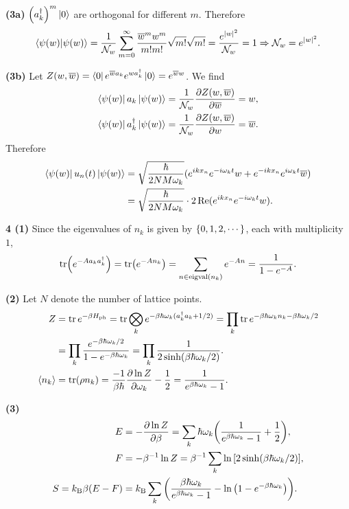 \documentclass{article}
\makeatletter
\newcommand*{\shifttext}[1]{%
  \settowidth{\@tempdima}{#1}%
  \hspace{-\@tempdima}#1%
}
\newcommand{\plabel}[1]{%
\shifttext{\textbf{#1}\quad}%
}
\newcommand{\prule}{%
\begin{center}%
\hdashrule[0.5ex]{.99\linewidth}{1pt}{1pt 2.5pt}%
\end{center}%
}
\makeatother
\begin{document}
\plabel{(3a)}%
$\qty(a_k^\dagger)^m\ket{0}$ are orthogonal for different $m$. Therefore
\[ \bra{\psi(w)}\ket{\psi(w)} = \frac{1}{\mathcal{N}_w} \sum_{m=0}^\infty \frac{\overline{w}^m w^m}{m! m!} \sqrt{m!}\sqrt{m!} = \frac{e^{\abs{w}^2}}{\mathcal{N}_w} = 1 \Rightarrow \mathcal{N}_w = e^{\abs{w}^2}. \]

\plabel{(3b)}%
Let $Z(w,\overline{w}) = \bra{0} e^{\overline{w}a_k} e^{w a^\dagger_k} \ket{0} = e^{\overline{w}w}$. We find
\begin{align*}
    \bra{\psi(w)}a_k\ket{\psi(w)} &= \frac{1}{\mathcal{N}_w} \pdv{Z(w,\overline{w})}{\overline{w}} = w, \\
    \bra{\psi(w)}a_k^\dagger\ket{\psi(w)} &= \frac{1}{\mathcal{N}_w} \pdv{Z(w,\overline{w})}{w} = \overline{w}.
\end{align*}
Therefore
\begin{align*}
    \bra{\psi(w)}u_n(t)\ket{\psi(w)} &= \sqrt{\frac{\hbar}{2N M\omega_k}} (e^{ikx_n} e^{-i\omega_k t}w + e^{-ikx_n}e^{i\omega_k t}\overline{w}) \\
    &= \sqrt{\frac{\hbar}{2N M\omega_k}} \cdot 2\Re (e^{ikx_n} e^{-i\omega_k t}w).
\end{align*}

\prule
\plabel{4 (1)}%
Since the eigenvalues of $n_k$ is given by $\qty{0,1,2,\cdots}$, each with multiplicity $1$,
\[ \tr(e^{-Aa_k a^\dagger_k}) = \tr(e^{-An_k}) = \sum_{n\in\operatorname{eigval}(n_k)} e^{-An} = \frac{1}{1-e^{-A}}. \]

\plabel{(2)}%
Let $N$ denote the number of lattice points.
\begin{align*}
    Z &= \tr e^{-\beta H_{\mathrm{ph}}} = \tr \bigotimes_k e^{-\beta \hbar\omega_k (a^\dagger_k a_k + 1/2)} = \prod_k \tr e^{-\beta \hbar\omega_k n_k - \beta \hbar\omega_k/2} \\
    &= \prod_k \frac{e^{-\beta\hbar\omega_k/2}}{1-e^{-\beta\hbar\omega_k}} = \prod_k \frac{1}{2\sinh (\beta\hbar\omega_k/2)}. \\
    \langle n_k \rangle &= \tr(\rho n_k) = \frac{-1}{\beta\hbar} \pdv{\ln Z}{\omega_k} - \frac{1}{2} = \frac{1}{e^{\beta\hbar\omega_k} - 1}.
\end{align*}

\plabel{(3)}%
\begingroup\abovedisplayskip=0pt\abovedisplayshortskip=0pt~\vspace*{-\baselineskip}%
\begin{align*}
    E &= -\pdv{\ln Z}{\beta} = \sum_k \hbar\omega_k \qty(\frac{1}{e^{\beta\hbar\omega_k} - 1} + \frac{1}{2}), \\
    F &= -\beta^{-1}\ln Z = \beta^{-1} \sum_k \ln \qty[2 \sinh(\beta\hbar\omega_k/2)], \\
    S = k_{\mathrm{B}}\beta(E - F) &= k_{\mathrm{B}}\sum_k \qty(\frac{\beta\hbar\omega_k}{e^{\beta\hbar\omega_k} - 1} - \ln\qty(1-e^{-\beta\hbar\omega_k})).
\end{align*}
\endgroup

% 
% 
\end{document}
